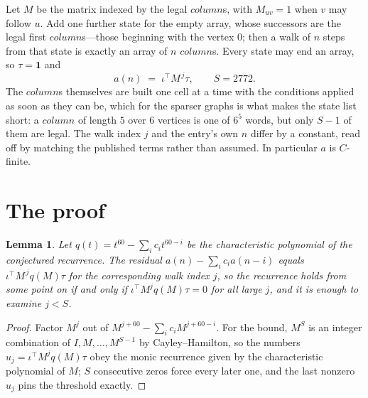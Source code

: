 \documentclass[11pt,a4paper]{article}
\theoremstyle{plain}
\newtheorem{lemma}[theorem]{Lemma}
\theoremstyle{definition}
\begin{document}
Let $M$ be the matrix indexed by the legal $column$s, with $M_{uv}=1$ when $v$ may
follow $u$. Add one further state for the empty array, whose successors are the legal first
$column$s---those beginning with the vertex $0$; then a walk of
$n$ steps from that state is exactly an array of $n$ $column$s. Every state may end an
array, so $\tau=\mathbf{1}$ and
\[
a(n)\;=\;\iota^{\!\top}M^{\,j}\tau ,\qquad S=2772.
\]
The $column$s themselves are built one cell at a time with the conditions applied as soon
as they can be, which for the sparser graphs is what makes the state list short: a $column$
of length $5$ over $6$ vertices is one of $6^{5}$ words, but only $S-1$ of them are
legal. The walk index $j$ and the entry's own $n$ differ by a constant, read off by matching the
published terms rather than assumed. In particular $a$ is $C$-finite.

\section{The proof}

\begin{lemma}\label{lem:crit}
Let $q(t)=t^{60}-\sum_i c_it^{60-i}$ be the characteristic polynomial of the
conjectured recurrence. The residual $a(n)-\sum_ic_ia(n-i)$ equals
$\iota^{\!\top}M^{\,j}q(M)\tau$ for the corresponding walk index $j$, so the recurrence
holds from some point on if and only if $\iota^{\!\top}M^{j}q(M)\tau=0$ for all large $j$,
and it is enough to examine $j<S$.
\end{lemma}

\begin{proof}
Factor $M^{j}$ out of $M^{j+60}-\sum_ic_iM^{j+60-i}$. For the bound, $M^{S}$
is an integer combination of $I,M,\dots,M^{S-1}$ by Cayley--Hamilton, so the numbers
$u_j=\iota^{\!\top}M^{j}q(M)\tau$ obey the monic recurrence given by the characteristic
polynomial of $M$; $S$ consecutive zeros force every later one, and the last nonzero $u_j$
pins the threshold exactly.
\end{proof}
\end{document}
